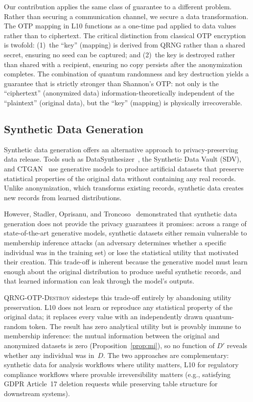 \documentclass[journal]{IEEEtran}
\begin{document}
Our contribution applies the same class of guarantee to a different problem. Rather than securing a communication channel, we secure a data transformation. The OTP mapping in L10 functions as a one-time pad applied to data values rather than to ciphertext. The critical distinction from classical OTP encryption is twofold: (1)~the ``key'' (mapping) is derived from QRNG rather than a shared secret, ensuring no seed can be captured; and (2)~the key is destroyed rather than shared with a recipient, ensuring no copy persists after the anonymization completes. The combination of quantum randomness and key destruction yields a guarantee that is strictly stronger than Shannon's OTP: not only is the ``ciphertext'' (anonymized data) information-theoretically independent of the ``plaintext'' (original data), but the ``key'' (mapping) is physically irrecoverable.

\subsection{Synthetic Data Generation}
\label{subsec:synth}

Synthetic data generation offers an alternative approach to privacy-preserving data release. Tools such as DataSynthesizer~\cite{ping2017datasynthesizer}, the Synthetic Data Vault (SDV), and CTGAN~\cite{xu2019ctgan} use generative models to produce artificial datasets that preserve statistical properties of the original data without containing any real records. Unlike anonymization, which transforms existing records, synthetic data creates new records from learned distributions.

However, Stadler, Oprisanu, and Troncoso~\cite{stadler2022synthetic} demonstrated that synthetic data generation does not provide the privacy guarantees it promises: across a range of state-of-the-art generative models, synthetic datasets either remain vulnerable to membership inference attacks (an adversary determines whether a specific individual was in the training set) or lose the statistical utility that motivated their creation. This trade-off is inherent because the generative model must learn enough about the original distribution to produce useful synthetic records, and that learned information can leak through the model's outputs.

\textsc{QRNG-OTP-Destroy} sidesteps this trade-off entirely by abandoning utility preservation. L10 does not learn or reproduce any statistical property of the original data; it replaces every value with an independently drawn quantum-random token. The result has zero analytical utility but is provably immune to membership inference: the mutual information between the original and anonymized datasets is zero (Proposition~\ref{prop:mi}), so no function of $D'$ reveals whether any individual was in~$D$. The two approaches are complementary: synthetic data for analysis workflows where utility matters, L10 for regulatory compliance workflows where provable irreversibility matters (e.g., satisfying GDPR Article~17 deletion requests while preserving table structure for downstream systems).
\end{document}
